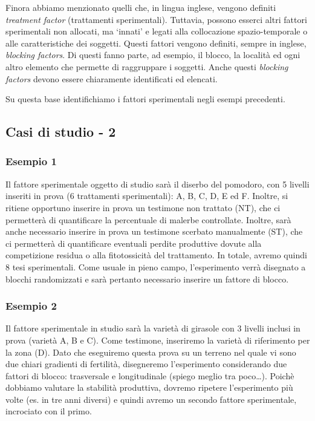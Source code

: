 \documentclass[a4paper,12pt,oneside]{book}
\begin{document}
Finora abbiamo menzionato quelli che, in lingua inglese, vengono
definiti \emph{treatment factor} (trattamenti sperimentali). Tuttavia,
possono esserci altri fattori sperimentali non allocati, ma `innati' e
legati alla collocazione spazio-temporale o alle caratteristiche dei
soggetti. Questi fattori vengono definiti, sempre in inglese,
\emph{blocking factors}. Di questi fanno parte, ad esempio, il blocco,
la località ed ogni altro elemento che permette di raggruppare i
soggetti. Anche questi \emph{blocking factors} devono essere chiaramente
identificati ed elencati.

Su questa base identifichiamo i fattori sperimentali negli esempi
precedenti.

\subsection{Casi di studio - 2}\label{casi-di-studio---2}

\subsubsection{Esempio 1}\label{esempio-1}

Il fattore sperimentale oggetto di studio sarà il diserbo del pomodoro,
con 5 livelli inseriti in prova (6 trattamenti sperimentali): A, B, C,
D, E ed F. Inoltre, si ritiene opportuno inserire in prova un testimone
non trattato (NT), che ci permetterà di quantificare la percentuale di
malerbe controllate. Inoltre, sarà anche necessario inserire in prova un
testimone scerbato manualmente (ST), che ci permetterà di quantificare
eventuali perdite produttive dovute alla competizione residua o alla
fitotossicità del trattamento. In totale, avremo quindi 8 tesi
sperimentali. Come usuale in pieno campo, l'esperimento verrà disegnato
a blocchi randomizzati e sarà pertanto necessario inserire un fattore di
blocco.

\subsubsection{Esempio 2}\label{esempio-2}

Il fattore sperimentale in studio sarà la varietà di girasole con 3
livelli inclusi in prova (varietà A, B e C). Come testimone, inseriremo
la varietà di riferimento per la zona (D). Dato che eseguiremo questa
prova su un terreno nel quale vi sono due chiari gradienti di fertilità,
disegneremo l'esperimento considerando due fattori di blocco:
trasversale e longitudinale (spiego meglio tra poco\ldots{}). Poichè
dobbiamo valutare la stabilità produttiva, dovremo ripetere
l'esperimento più volte (es. in tre anni diversi) e quindi avremo un
secondo fattore sperimentale, incrociato con il primo.
\end{document}
